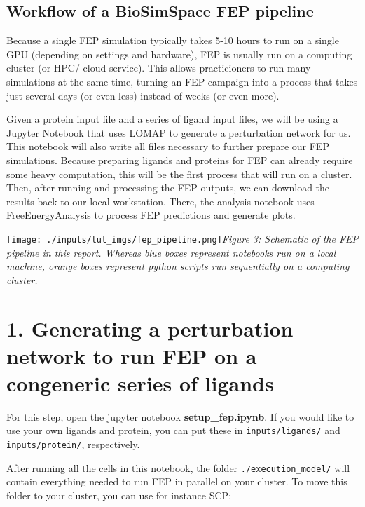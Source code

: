 \hypertarget{workflow-of-a-biosimspace-fep-pipeline}{%
\subsection{Workflow of a BioSimSpace FEP
pipeline}\label{workflow-of-a-biosimspace-fep-pipeline}}

Because a single FEP simulation typically takes 5-10 hours to run on a
single GPU (depending on settings and hardware), FEP is usually run on a
computing cluster (or HPC/ cloud service). This allows practicioners to
run many simulations at the same time, turning an FEP campaign into a
process that takes just several days (or even less) instead of weeks (or
even more).

Given a protein input file and a series of ligand input files, we will
be using a Jupyter Notebook that uses LOMAP to generate a perturbation
network for us. This notebook will also write all files necessary to
further prepare our FEP simulations. Because preparing ligands and
proteins for FEP can already require some heavy computation, this will
be the first process that will run on a cluster. Then, after running and
processing the FEP outputs, we can download the results back to our
local workstation. There, the analysis notebook uses FreeEnergyAnalysis
to process FEP predictions and generate plots.

\texttt{[image: ./inputs/tut\_imgs/fep\_pipeline.png]}\emph{Figure 3:
Schematic of the FEP pipeline in this report. Whereas blue boxes
represent notebooks run on a local machine, orange boxes represent
python scripts run sequentially on a computing cluster.}

\hypertarget{generating-a-perturbation-network-to-run-fep-on-a-congeneric-series-of-ligands}{%
\section{1. Generating a perturbation network to run FEP on a congeneric
series of
ligands}\label{generating-a-perturbation-network-to-run-fep-on-a-congeneric-series-of-ligands}}

For this step, open the jupyter notebook \textbf{setup\_fep.ipynb}. If
you would like to use your own ligands and protein, you can put these in
\texttt{inputs/ligands/} and \texttt{inputs/protein/}, respectively.

After running all the cells in this notebook, the folder
\texttt{./execution\_model/} will contain everything needed to run FEP
in parallel on your cluster. To move this folder to your cluster, you
can use for instance SCP:

